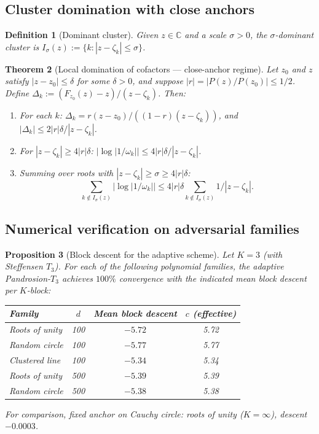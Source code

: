 \documentclass[11pt,a4paper]{article}
\newtheorem{theorem}{Theorem}[section]
\newtheorem{proposition}[theorem]{Proposition}
\newtheorem{definition}[theorem]{Definition}
\begin{document}
\subsection{Cluster domination with close anchors}

\begin{definition}[Dominant cluster]
Given $z \in \mathbb{C}$ and a scale $\sigma > 0$, the $\sigma$-dominant cluster is $I_\sigma(z) := \{k : |z - \zeta_k| \le \sigma\}$.
\end{definition}

\begin{theorem}[Local domination of cofactors --- close-anchor regime]\label{thm:cluster}
Let $z_0$ and $z$ satisfy $|z - z_0| \le \delta$ for some $\delta > 0$, and suppose $|r| = |P(z)/P(z_0)| \le 1/2$. Define $\Delta_k := (F_{z_0}(z) - z)/(z - \zeta_k)$. Then:
\begin{enumerate}
\item For each $k$: $\Delta_k = r(z - z_0)/((1 - r)(z - \zeta_k))$, and $|\Delta_k| \le 2|r|\delta/|z - \zeta_k|$.
\item For $|z - \zeta_k| \ge 4|r|\delta$: $|\log|1/\omega_k|| \le 4|r|\delta/|z - \zeta_k|$.
\item Summing over roots with $|z - \zeta_k| \ge \sigma \ge 4|r|\delta$:
$$ \sum_{k \notin I_\sigma(z)} |\log|1/\omega_k|| \le 4|r|\delta \sum_{k \notin I_\sigma(z)} 1/|z - \zeta_k|. $$
\end{enumerate}
\end{theorem}

\subsection{Numerical verification on adversarial families}

\begin{proposition}[Block descent for the adaptive scheme]
Let $K = 3$ (with Steffensen $T_3$). For each of the following polynomial families, the adaptive Pandrosion-$T_3$ achieves $100\%$ convergence with the indicated mean block descent per $K$-block:
\begin{center}
\begin{tabular}{lccc}
\toprule
\textbf{Family} & $d$ & Mean block descent & $c$ (effective) \\
\midrule
Roots of unity & 100 & $-5.72$ & 5.72 \\
Random circle  & 100 & $-5.77$ & 5.77 \\
Clustered line & 100 & $-5.34$ & 5.34 \\
Roots of unity & 500 & $-5.39$ & 5.39 \\
Random circle  & 500 & $-5.38$ & 5.38 \\
\bottomrule
\end{tabular}
\end{center}
For comparison, fixed anchor on Cauchy circle: roots of unity ($K = \infty$), descent $-0.0003$.
\end{proposition}
\end{document}
